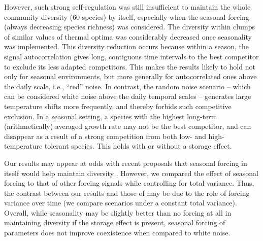 \documentclass[a4paper,12pt]{article}
\begin{document}
However, such strong self-regulation was still insufficient to maintain
the whole community diversity (60 species) by itself, especially when
the seasonal forcing (always decreasing species richness) was considered.
The diversity within clumps of similar values of thermal optima was
considerably decreased once seasonality was implemented. This diversity
reduction occurs because within a season, the signal autocorrelation
gives long, contiguous time intervals to the best competitor to exclude
its less adapted competitors. This makes the results likely to hold
not only for seasonal environments, but more generally for autocorrelated
ones above the daily scale, i.e., ``red'' noise. In contrast, the
random noise scenario -- which can be considered white noise above
the daily temporal scales -- generates large temperature shifts more
frequently, and thereby forbids such competitive exclusion. In a seasonal
setting, a species with the highest long-term (arithmetically) averaged
growth rate may not be the best competitor, and can disappear as a
result of a strong competition from both low- and high-temperature
tolerant species. This holds with or without a storage effect. 

Our results may appear at odds with recent proposals that seasonal
forcing in itself would help maintain diversity \citep{sakavara_lumpy_2018}.
However, we compared the effect of seasonal forcing to that of other
forcing signals while controlling for total variance. Thus, the contrast
between our results and those of \citet{sakavara_lumpy_2018} may
be due to the role of forcing variance over time (we compare scenarios
under a constant total variance). Overall, while seasonality may be
slightly better than no forcing at all in maintaining diversity if
the storage effect is present, seasonal forcing of parameters does not
improve coexistence when compared to white noise.
\end{document}
